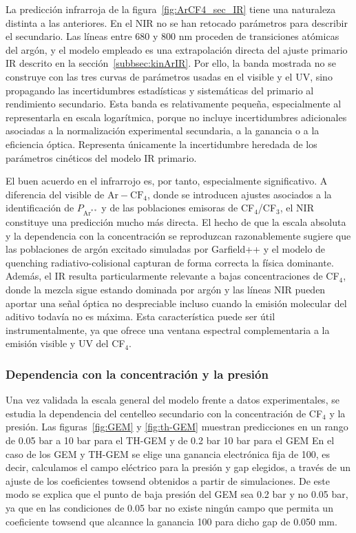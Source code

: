 \documentclass[12pt,a4paper]{article}
\newcommand{\Ar}{\mathrm{Ar}}
\newcommand{\CF}{\mathrm{CF}}
\begin{document}
La predicción infrarroja de la figura~\ref{fig:ArCF4_sec_IR} tiene una naturaleza distinta a las anteriores. En el NIR no se han retocado parámetros para describir el secundario. Las líneas entre 680 y 800 nm proceden de transiciones atómicas del argón, y el modelo empleado es una extrapolación directa del ajuste primario IR descrito en la sección~\ref{subbsec:kinArIR}. Por ello, la banda mostrada no se construye con las tres curvas de parámetros usadas en el visible y el UV, sino propagando las incertidumbres estadísticas y sistemáticas del primario al rendimiento secundario. Esta banda es relativamente pequeña, especialmente al representarla en escala logarítmica, porque no incluye incertidumbres adicionales asociadas a la normalización experimental secundaria, a la ganancia o a la eficiencia óptica. Representa únicamente la incertidumbre heredada de los parámetros cinéticos del modelo IR primario.

El buen acuerdo en el infrarrojo es, por tanto, especialmente significativo. A diferencia del visible de $\Ar-\CF_4$, donde se introducen ajustes asociados a la identificación de $P_{\Ar^{**}}$ y de las poblaciones emisoras de CF$_4$/CF$_3$, el NIR constituye una predicción mucho más directa. El hecho de que la escala absoluta y la dependencia con la concentración se reproduzcan razonablemente sugiere que las poblaciones de argón excitado simuladas por Garfield++ y el modelo de quenching radiativo-colisional capturan de forma correcta la física dominante. Además, el IR resulta particularmente relevante a bajas concentraciones de CF$_4$, donde la mezcla sigue estando dominada por argón y las líneas NIR pueden aportar una señal óptica no despreciable incluso cuando la emisión molecular del aditivo todavía no es máxima. Esta característica puede ser útil instrumentalmente, ya que ofrece una ventana espectral complementaria a la emisión visible y UV del CF$_4$.

\subsubsection{Dependencia con la concentración y la presión}

Una vez validada la escala general del modelo frente a datos experimentales, se estudia la dependencia del centelleo secundario con la concentración de CF$_4$ y la presión. Las figuras~\ref{fig:GEM} y \ref{fig:th-GEM} muestran predicciones en un rango de 0.05 bar a 10 bar para el TH-GEM y de 0.2 bar 10 bar para el GEM  En el caso de los GEM y TH-GEM se elige una ganancia electrónica fija de 100, es decir, calculamos el campo eléctrico para la presión y gap elegidos, a través de un ajuste de los coeficientes towsend obtenidos a partir de simulaciones. De este modo se explica que el punto de baja presión del GEM sea 0.2 bar y no 0.05 bar, ya que en las condiciones de 0.05 bar no existe ningún campo que permita un coeficiente towsend que alcannce la ganancia 100 para dicho gap de 0.050 mm. 
\end{document}

